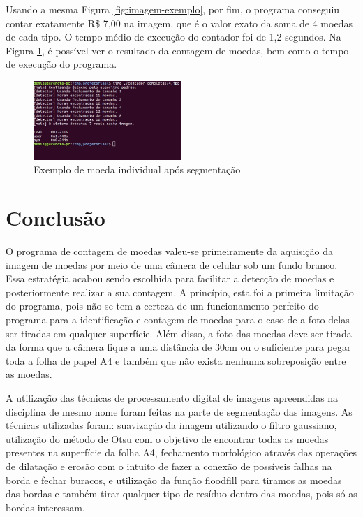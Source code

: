 \documentclass[10pt,journal,compsoc]{IEEEtran}
\begin{document}
Usando a mesma Figura \ref{fig:imagem-exemplo}, por fim, o programa conseguiu contar exatamente R\$ 7,00 na imagem, que é o valor exato da soma de 4 moedas de cada tipo. O tempo médio de execução do contador foi de 1,2 segundos. Na Figura  \ref{fig:resultado-contador}, é possível ver o resultado da contagem de moedas, bem como o tempo de execução do programa.

\begin{figure}[ht]
\centering
\caption{Exemplo de moeda individual após segmentação}
\label{fig:resultado-contador}
\includegraphics[width=0.5\textwidth]{resultado-contador.jpg}
\end{figure}


\section{Conclusão}
\label{sec:conclusao}

O programa de contagem de moedas valeu-se primeiramente da aquisição da imagem de moedas por meio de uma câmera de celular sob um fundo branco. Essa estratégia acabou sendo escolhida para facilitar a detecção de moedas e posteriormente realizar a sua contagem. A princípio, esta foi a primeira limitação do programa, pois não se tem a certeza de um funcionamento perfeito do programa para a identificação e contagem de moedas para o caso de a foto delas ser tiradas em qualquer superfície. Além disso, a foto das moedas deve ser tirada da forma que a câmera fique a uma distância de 30cm ou o suficiente para pegar toda a folha de papel A4 e também que não exista nenhuma sobreposição entre as moedas.

A utilização das técnicas de processamento digital de imagens apreendidas na disciplina de mesmo nome foram feitas na parte de segmentação das imagens. As técnicas utilizadas foram: suavização da imagem utilizando o filtro gaussiano, utilização do método de Otsu com o objetivo de encontrar todas as moedas presentes na superfície da folha A4, fechamento morfológico através das operações de dilatação e erosão com o intuito de fazer a conexão de possíveis falhas na borda e fechar buracos, e utilização da função floodfill para tiramos as moedas das bordas e também tirar qualquer tipo de resíduo dentro das moedas, pois só as bordas interessam.
\end{document}
